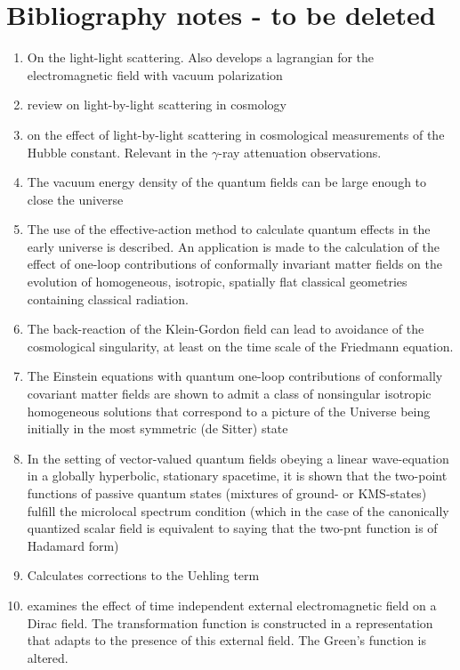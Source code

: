 \chapter{Bibliography notes - to be deleted}
\begin{enumerate}
\item \cite{Eule1935} On the light-light scattering. Also develops a lagrangian for the electromagnetic field with vacuum polarization
\item \cite{Fran2021} review on light-by-light scattering in cosmology
\item \cite{Domí2019} on the effect of light-by-light scattering in cosmological measurements of the Hubble constant. Relevant in the $\gamma$-ray attenuation observations.
\item \cite{Anderson:1985vi} The vacuum energy density of the quantum fields can be large enough to close the universe
\item \cite{Hartle1979} The use of the effective-action method to calculate quantum effects in the early universe is described. An application is made to the calculation of the effect of one-loop contributions of conformally invariant matter fields on the evolution of homogeneous, isotropic, spatially flat classical geometries containing classical radiation.
\item \cite{Fulling1973} The back-reaction of the Klein-Gordon field can lead to avoidance of the cosmological singularity, at least on the time scale of the Friedmann equation.
\item \cite{STAROBINSKY198099} The Einstein equations with quantum one-loop contributions of conformally covariant matter fields are shown to admit a class of nonsingular isotropic homogeneous solutions that correspond to a picture of the Universe being initially in the most symmetric (de Sitter) state
\item \cite{Sahlmann2000}  In the setting of vector-valued quantum fields obeying a linear wave-equation in a globally hyperbolic, stationary spacetime, it is shown that the two-point functions of passive quantum states (mixtures of ground- or KMS-states) fulfill the microlocal spectrum condition (which in the case of the canonically quantized scalar field is equivalent to saying that the two-pnt function is of Hadamard form)
\item \cite{PhysRev.101.843} Calculates corrections to the Uehling term
\item \cite{Schwinger54} examines the effect of time independent external electromagnetic field on a Dirac field. The transformation function is constructed in a representation that adapts to the presence of this external field.
The Green's function is altered. 


\end{enumerate}
